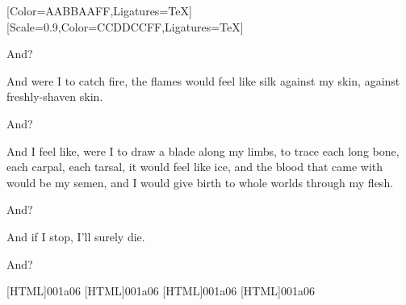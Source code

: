\begin{paracol}{2}
\begin{leftcolumn}
  [Color=AABBAAFF,Ligatures=TeX]
  \renewfontfamily{}[Scale=0.9,Color=CCDDCCFF,Ligatures=TeX]

\null
\vfill

\begin{ally}
And?
\end{ally}
And were I to catch fire, the flames would feel like silk against my skin, against freshly-shaven skin.

\begin{ally}
And?
\end{ally}
And I feel like, were I to draw a blade along my limbs, to trace each long bone, each carpal, each tarsal, it would feel like ice, and the blood that came with would be my semen, and I would give birth to whole worlds through my flesh.

\begin{ally}
And?
\end{ally}
And if I stop, I'll surely die.

\begin{ally}
And?
\end{ally}
\vfill

\newpage
\null
\thispagestyle{empty}
\newpage
\end{leftcolumn}
\end{paracol}

[HTML]{001a06}
[HTML]{001a06}
[HTML]{001a06}
[HTML]{001a06}

